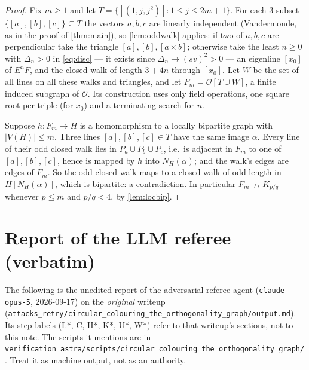 \documentclass[11pt,a4paper]{article}
\theoremstyle{plain}
\theoremstyle{definition}
\theoremstyle{remark}
\newcommand{\cO}{\mathcal O}
\newcommand{\Kc}[2]{K_{#1/#2}}
\newcommand{\Pl}[1]{P_{#1}}
\newcommand{\Fin}[1]{F_{#1}}
\begin{document}
\label{pf:witness}
\propwitness*
\begin{proof}
Fix $m\ge1$ and let $T=\{[(1,j,j^2)]:1\le j\le 2m+1\}$. For each $3$-subset $\{[a],[b],[c]\}\subseteq T$ the vectors $a,b,c$ are linearly independent (Vandermonde, as in the proof of \cref{thm:main}), so \cref{lem:oddwalk} applies: if two of $a,b,c$ are perpendicular take the triangle $[a],[b],[a\times b]$; otherwise take the least $n\ge0$ with $\Delta_n>0$ in \eqref{eq:disc} --- it exists since $\Delta_n\to(sv)^2>0$ --- an eigenline $[x_0]$ of $E^nF$, and the closed walk of length $3+4n$ through $[x_0]$. Let $W$ be the set of all lines on all these walks and triangles, and let $\Fin m=\cO[T\cup W]$, a finite induced subgraph of $\cO$. Its construction uses only field operations, one square root per triple (for $x_0$) and a terminating search for $n$.

Suppose $h\colon\Fin m\to H$ is a homomorphism to a locally bipartite graph with $|V(H)|\le m$. Three lines $[a],[b],[c]\in T$ have the same image $\alpha$. Every line of their odd closed walk lies in $\Pl a\cup\Pl b\cup\Pl c$, i.e.\ is adjacent in $\Fin m$ to one of $[a],[b],[c]$, hence is mapped by $h$ into $N_H(\alpha)$; and the walk's edges are edges of $\Fin m$. So the odd closed walk maps to a closed walk of odd length in $H[N_H(\alpha)]$, which is bipartite: a contradiction. In particular $\Fin m\nrightarrow\Kc pq$ whenever $p\le m$ and $p/q<4$, by \cref{lem:locbip}.
\end{proof}

\section{Report of the LLM referee (verbatim)}\label{app:referee}

\begin{tcolorbox}[colback=gray!8,colframe=gray!50,boxrule=0.4pt,arc=2pt]
\small The following is the unedited report of the adversarial referee agent (\texttt{claude-opus-5}, 2026-09-17) on the \emph{original} writeup (\texttt{attacks\_retry/circular\_colouring\_the\_orthogonality\_graph/output.md}). Its step labels (L*, C, H*, K*, U*, W*) refer to that writeup's sections, not to this note. The scripts it mentions are in \texttt{verification\_astra/scripts/circular\_colouring\_the\_orthogonality\_graph/}. Treat it as machine output, not as an authority.
\end{tcolorbox}


\end{document}
